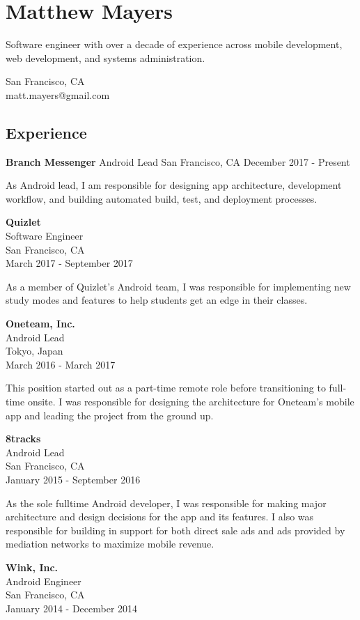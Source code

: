 \documentclass[]{article}
\date{}
\begin{document}
\section{Matthew Mayers}\label{matthew-mayers}

Software engineer with over a decade of experience across mobile
development, web development, and systems administration.

San Francisco, CA\\
matt.mayers@gmail.com

\subsection{Experience}\label{experience}

\textbf{Branch Messenger} Android Lead San Francisco, CA December 2017 -
Present

As Android lead, I am responsible for designing app architecture,
development workflow, and building automated build, test, and deployment
processes.

\textbf{Quizlet}\\
Software Engineer\\
San Francisco, CA\\
March 2017 - September 2017

As a member of Quizlet's Android team, I was responsible for
implementing new study modes and features to help students get an edge
in their classes.

\textbf{Oneteam, Inc.}\\
Android Lead\\
Tokyo, Japan\\
March 2016 - March 2017

This position started out as a part-time remote role before
transitioning to full-time onsite. I was responsible for designing the
architecture for Oneteam's mobile app and leading the project from the
ground up.

\textbf{8tracks}\\
Android Lead\\
San Francisco, CA\\
January 2015 - September 2016

As the sole fulltime Android developer, I was responsible for making
major architecture and design decisions for the app and its features. I
also was responsible for building in support for both direct sale ads
and ads provided by mediation networks to maximize mobile revenue.

\textbf{Wink, Inc.}\\
Android Engineer\\
San Francisco, CA\\
January 2014 - December 2014
\end{document}
